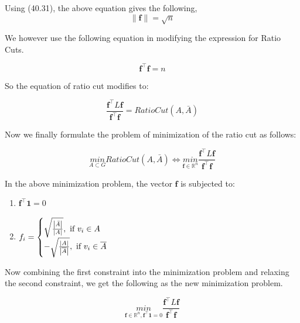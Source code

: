 \documentclass[english]{article}
\theoremstyle{plain}
\begin{document}
\begin{enumerate}
Using (40.31), the above equation gives the following,
\begin{equation}
\|\boldsymbol{f}\| = \sqrt{n}
\end{equation}

We however use the following equation in modifying the expression for Ratio Cuts.

\begin{equation}
\boldsymbol{f}^{\top}\boldsymbol{f} = n
\end{equation}

So the equation of ratio cut modifies to:

\begin{equation}
\frac{\boldsymbol{f}^{\top}L\boldsymbol{f}}{\boldsymbol{f}^{\top}\boldsymbol{f}} = Ratio Cut(A,\bar{A})
\end{equation}

\end{enumerate}

Now we finally formulate the problem of minimization of the ratio cut as follows:

\begin{equation}
\underset{A \subset G}{min} RatioCut(A,\bar{A}) 
\iff \underset{\boldsymbol{f} \in \mathbb{R}^{n}}{min} \frac{\boldsymbol{f}^{\top}L\boldsymbol{f}}{\boldsymbol{f}^{\top}\boldsymbol{f}}
\end{equation}

In the above minimization problem, the vector $\boldsymbol{f}$ is subjected to:
\begin{enumerate}
\item $\boldsymbol{f}^{\top}\boldsymbol{1} = 0$
\item $f_{i} = \begin{cases}
\sqrt{\frac{\left| \bar{A} \right|}{\left| A \right|}}, \textnormal{ if } v_{i} \in A \\
-\sqrt{\frac{\left| A \right|}{\left| \overline{A} \right|}}, \textnormal{ if } v_{i} \in \overline{A}\\
\end{cases}$
\end{enumerate}


Now combining the first constraint into the minimization problem and relaxing the second constraint, we get the following as the new minimization problem.

\begin{equation}
\underset{\boldsymbol{f} \in \mathbb{R}^{n},\boldsymbol{f}^{\top}\boldsymbol{1}=0}{min} \frac{\boldsymbol{f}^{\top}L\boldsymbol{f}}{\boldsymbol{f}^{\top}\boldsymbol{f}}
\end{equation}
\end{document}
